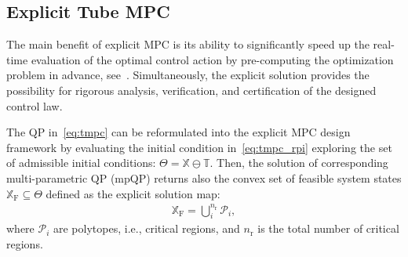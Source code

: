 \documentclass[letterpaper, 10 pt, conference]{ieeeconf}
\begin{document}
	\subsection{Explicit Tube MPC}
	\label{sec:explicit_mpc}
	
	The main benefit of explicit MPC is its ability to significantly speed up the real-time evaluation of the optimal control action by pre-computing the optimization problem in advance, see~\cite{BM02}. Simultaneously, the explicit solution provides the possibility for rigorous analysis, verification, and certification of the designed control law. 
	
	The QP in~\eqref{eq:tmpc} can be reformulated into the explicit MPC design framework by evaluating the initial condition in~\eqref{eq:tmpc_rpi} exploring the set of admissible initial conditions: $\Theta = \mathbb{X} \ominus \mathbb{T}$. Then, the solution of corresponding multi-parametric QP (mpQP) returns also the convex set of feasible system states $\mathbb{X}_{\mathrm{F}} \subseteq \Theta$ defined as the explicit solution map:
	\begin{eqnarray}
		\label{eq:tmpc_partition}
		\mathbb{X}_{\mathrm{F}} = \bigcup_{i}^{n_{\mathrm{r}}} \mathcal{P}_{i} ,
	\end{eqnarray}
	where $\mathcal{P}_{i}$ are polytopes, i.e., critical regions, and $n_{\mathrm{r}}$ is the total number of critical regions.
	
\end{document}
